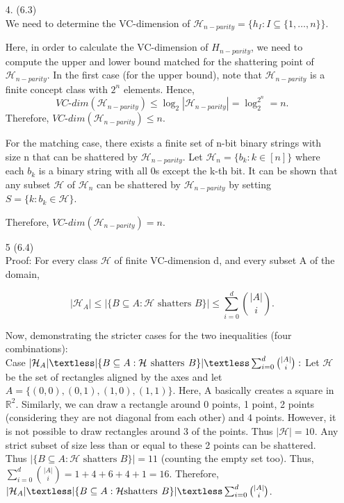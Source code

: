 \documentclass[12pt,letterpaper]{article}
\begin{document}
\begin{enumerate}
\vspace{8pt}

\item[4.] (6.3) \\
We need to determine the VC-dimension of $\mathcal{H}_{n-parity} = \{h_I : I \subseteq \{1, \dots, n\}\}$.

Here, in order to calculate the VC-dimension of $H_{n-parity}$, we need to compute the upper and lower bound matched for the shattering point of $\mathcal{H}_{n-parity}$. In the first case (for the upper bound), note that $\mathcal{H}_{n-parity}$ is a finite concept class with $2^n$ elements. Hence,  
$$
VC\text{-}dim(\mathcal{H}_{n-parity}) \leq \log_2|\mathcal{H}_{n-parity}| = \log_2^{2^n} = n.$$
Therefore, $VC\text{-}dim(\mathcal{H}_{n-parity}) \leq n$.

For the matching case, there exists a finite set of n-bit binary strings with size n that can be shattered by $\mathcal{H}_{n-parity}$. Let $\mathcal{H}_n = \{b_k : k \in [n]\}$ where each $b_k$ is a binary string with all 0s except the k-th bit. It can be shown that any subset $\mathcal{H}$ of $\mathcal{H}_n$ can be shattered by $\mathcal{H}_{n-parity}$ by setting $S = \{k : b_k \in \mathcal{H}\}$.

Therefore, $VC\text{-}dim(\mathcal{H}_{n-parity}) = n$.

\newpage

\item[5] (6.4) \\
Proof: 
For every class $\mathcal{H}$ of finite VC-dimension d, and every subset A of the domain,

$$|\mathcal{H}_A| \leq |\{B \subseteq A : \mathcal{H}\hspace{4pt} \text{shatters}\hspace{4pt} B\}| \leq \sum_{i=0}^d {|A| \choose i}.$$

Now, demonstrating the stricter cases for the two inequalities (four combinations):\\

Case $|\mathcal{H}_A| \textless |\{B \subseteq A : \mathcal{H}\hspace{4pt} \text{shatters}\hspace{4pt} B\}| \textless \sum_{i=0}^d {|A| \choose i}:$ Let $\mathcal{H}$ be the set of rectangles aligned by the axes and let $A = \{(0, 0), (0, 1), (1, 0), (1, 1)\}$. Here, A basically creates a square in $\mathbb{R}^2$. Similarly, we can draw a rectangle around 0 points, 1 point, 2 points (considering they are not diagonal from each other) and 4 points. However, it is not possible to draw rectangles around 3 of the points. Thus $|\mathcal{H}| = 10.$ Any strict subset of size less than or equal to these 2 points can be shattered. Thus $|\{B \subseteq A : \mathcal{H}\hspace{4pt} \text{shatters}\hspace{4pt} B\}| = 11$ (counting the empty set too). 
Thus, $\sum_{i=0}^d {|A|\choose i} = 1 + 4 + 6 + 4 + 1 = 16$. Therefore,  $|\mathcal{H}_A| \textless |\{B \subseteq A : \mathcal{H} \text{shatters}\hspace{4pt} B\}| \textless \sum_{i=0}^d {|A| \choose i}$. \\


\end{enumerate}
\end{document}
